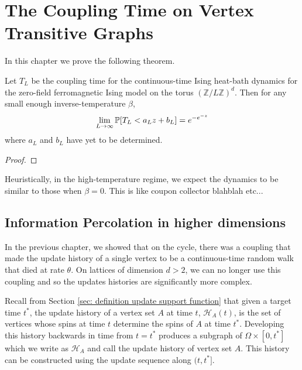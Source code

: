 \chapter{The Coupling Time on Vertex Transitive Graphs}
\label{Ch:GeneralResults}

	
In this chapter we prove the following theorem.

\begin{conjecture}
\label{thm:Coupling Distribution on Lattice}
	Let $T_L$ be the coupling time for the continuous-time Ising heat-bath 
	dynamics for the zero-field ferromagnetic Ising model on the torus
	$(\mathbb{Z} / L \mathbb{Z})^d$. Then for any small enough 
	inverse-temperature $\beta$,
	\begin{equation}
		\lim_{L \rightarrow \infty} \mathbb{P}[T_L < a_L z + b_L] = e^{-e^{-z}}
	\end{equation}
	where $a_L$ and $b_L$ have yet to be determined.
\end{conjecture}
\begin{proof}
\end{proof}

Heuristically, in the high-temperature regime, we expect the dynamics to be similar to those when $\beta = 0$. This is like coupon collector blahblah etc...

\section{Information Percolation in higher dimensions}
In the previous chapter, we showed that on the cycle, there was a coupling that made the update history of a single vertex to be a continuous-time random walk that died at rate $\theta$. On lattices of dimension $d > 2$, we can no longer use this coupling and so the updates histories are significantly more complex. 

Recall from Section \ref{sec: definition update support function} that given a target time $t^*$, the update history of a vertex set $A$ at time $t$, $\mathcal{H}_A(t)$, is the set of vertices whose spins at time $t$ determine the spins of $A$ at time $t^*$. Developing this history backwards in time from $t = t^*$ produces a subgraph of $\Omega \times [0, t^*]$ which we write as $\mathcal{H}_A$ and call the update history of vertex set $A$. This history can be constructed using the update sequence along $(t, t^*]$. 

